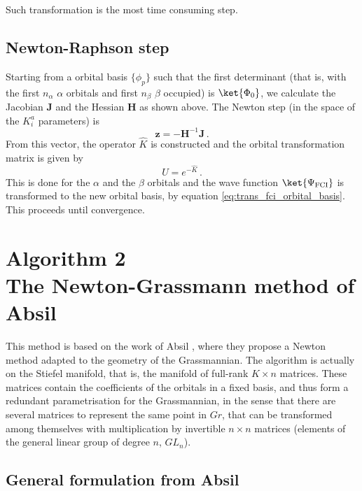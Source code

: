 \documentclass[a4paper,11pt]{article}
\begin{document}
Such transformation is the most time consuming step.


\subsection{Newton-Raphson step}
Starting from a orbital basis $\{\phi_p\}$ such that the first determinant (that is, with the first $n_\alpha$ $\alpha$ orbitals and first $n_\beta$ $\beta$ occupied) is $\ket{\Phi_0}$, we calculate the Jacobian $\mathbf{J}$ and the Hessian $\mathbf{H}$ as shown above.
The Newton step (in the space of the $K_i^a$ parameters) is
\begin{equation}
  \mathbf{z} = -\mathbf{H}^{-1} \mathbf{J}\,.
\end{equation}
From this vector, the operator $\hat{K}$ is constructed and the orbital transformation matrix is given by
\begin{equation}
  U = e^{-\hat{K}}\,.
\end{equation}
This is done for the $\alpha$ and the $\beta$ orbitals and the wave function $\ket{\Psi_\text{FCI}}$ is transformed to the new orbital basis, by equation \ref{eq:trans_fci_orbital_basis}.
This proceeds until convergence.


\newpage
\section{\textsf{\LARGE Algorithm 2}\\The Newton-Grassmann method of Absil}

This method is based on the work of Absil \etal{}, where they propose a Newton method adapted to the geometry of the Grassmannian.
The algorithm is actually on the Stiefel manifold, that is, the manifold of full-rank $K \times n$ matrices.
These matrices contain the coefficients of the orbitals in a fixed basis, and thus form a redundant parametrisation for the Grassmannian, in the sense that there are several matrices to represent the same point in $Gr$, that can be transformed among themselves with multiplication by invertible $n \times n$ matrices (elements of the general linear group of degree $n$, $GL_n$).

\subsection{General formulation from Absil}
\end{document}
